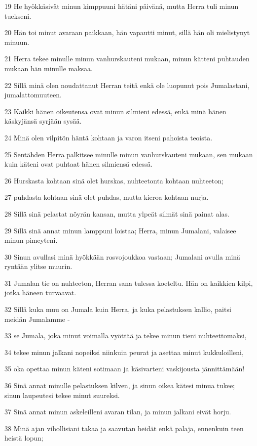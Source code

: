 \par 19 He hyökkäsivät minun kimppuuni hätäni päivänä, mutta Herra tuli minun tuekseni.
\par 20 Hän toi minut avaraan paikkaan, hän vapautti minut, sillä hän oli mielistynyt minuun.
\par 21 Herra tekee minulle minun vanhurskauteni mukaan, minun kätteni puhtauden mukaan hän minulle maksaa.
\par 22 Sillä minä olen noudattanut Herran teitä enkä ole luopunut pois Jumalastani, jumalattomuuteen.
\par 23 Kaikki hänen oikeutensa ovat minun silmieni edessä, enkä minä hänen käskyjänsä syrjään sysää.
\par 24 Minä olen vilpitön häntä kohtaan ja varon itseni pahoista teoista.
\par 25 Sentähden Herra palkitsee minulle minun vanhurskauteni mukaan, sen mukaan kuin käteni ovat puhtaat hänen silmiensä edessä.
\par 26 Hurskasta kohtaan sinä olet hurskas, nuhteetonta kohtaan nuhteeton;
\par 27 puhdasta kohtaan sinä olet puhdas, mutta kieroa kohtaan nurja.
\par 28 Sillä sinä pelastat nöyrän kansan, mutta ylpeät silmät sinä painat alas.
\par 29 Sillä sinä annat minun lamppuni loistaa; Herra, minun Jumalani, valaisee minun pimeyteni.
\par 30 Sinun avullasi minä hyökkään rosvojoukkoa vastaan; Jumalani avulla minä ryntään ylitse muurin.
\par 31 Jumalan tie on nuhteeton, Herran sana tulessa koeteltu. Hän on kaikkien kilpi, jotka häneen turvaavat.
\par 32 Sillä kuka muu on Jumala kuin Herra, ja kuka pelastuksen kallio, paitsi meidän Jumalamme -
\par 33 se Jumala, joka minut voimalla vyöttää ja tekee minun tieni nuhteettomaksi,
\par 34 tekee minun jalkani nopeiksi niinkuin peurat ja asettaa minut kukkuloilleni,
\par 35 oka opettaa minun käteni sotimaan ja käsivarteni vaskijousta jännittämään!
\par 36 Sinä annat minulle pelastuksen kilven, ja sinun oikea kätesi minua tukee; sinun laupeutesi tekee minut suureksi.
\par 37 Sinä annat minun askeleilleni avaran tilan, ja minun jalkani eivät horju.
\par 38 Minä ajan vihollisiani takaa ja saavutan heidät enkä palaja, ennenkuin teen heistä lopun;
